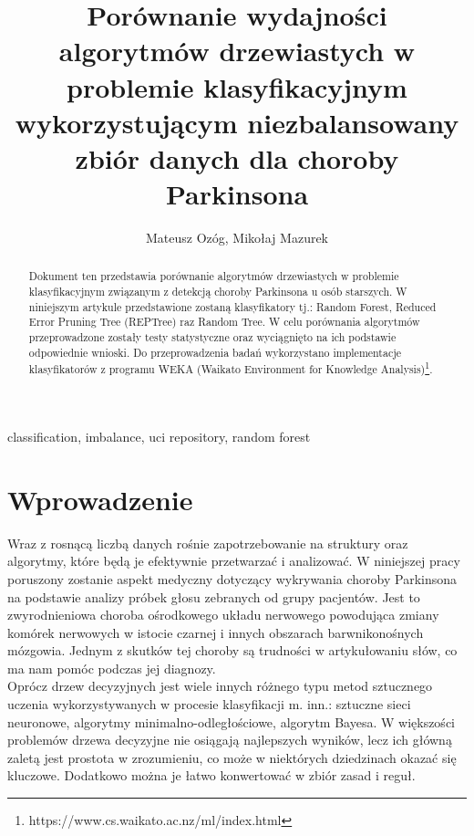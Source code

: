 \documentclass[conference]{IEEEtran}
\begin{document}
\title{Porównanie wydajności algorytmów drzewiastych w problemie klasyfikacyjnym wykorzystującym niezbalansowany zbiór danych dla choroby Parkinsona}

\author{Mateusz Ozóg, Mikołaj Mazurek}

\maketitle

\begin{abstract}
Dokument ten przedstawia porównanie algorytmów drzewiastych w problemie klasyfikacyjnym związanym z detekcją choroby Parkinsona u osób starszych. W niniejszym artykule przedstawione zostaną klasyfikatory tj.: Random Forest, Reduced Error Pruning Tree (REPTree) raz Random Tree. W celu porównania algorytmów przeprowadzone zostały testy statystyczne oraz wyciągnięto na ich podstawie odpowiednie wnioski. Do przeprowadzenia badań wykorzystano implementacje klasyfikatorów z programu WEKA (Waikato Environment for Knowledge Analysis)\footnote{https://www.cs.waikato.ac.nz/ml/index.html}.
\end{abstract}

\begin{IEEEkeywords}
classification, imbalance, uci repository, random forest
\end{IEEEkeywords}

\section{Wprowadzenie}
Wraz z rosnącą liczbą danych rośnie zapotrzebowanie na struktury oraz algorytmy, które będą je efektywnie przetwarzać i analizować. W niniejszej pracy poruszony zostanie aspekt medyczny dotyczący wykrywania choroby Parkinsona na podstawie analizy próbek głosu zebranych od grupy pacjentów. Jest to zwyrodnieniowa choroba ośrodkowego układu nerwowego powodująca zmiany komórek nerwowych w istocie czarnej i innych obszarach barwnikonośnych mózgowia. Jednym z skutków tej choroby są trudności w artykułowaniu słów, co ma nam pomóc podczas jej diagnozy. \\
\indent Oprócz drzew decyzyjnych jest wiele innych różnego typu metod sztucznego uczenia wykorzystywanych w procesie klasyfikacji m. inn.: sztuczne sieci neuronowe, algorytmy minimalno-odległościowe, algorytm Bayesa. W większości problemów drzewa decyzyjne nie osiągają najlepszych wyników, lecz ich główną zaletą jest prostota w zrozumieniu, co może w niektórych dziedzinach okazać się kluczowe. Dodatkowo można je łatwo konwertować w zbiór zasad i reguł. \\
\indent %
\end{document}
